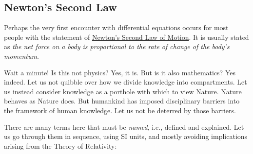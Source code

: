 \documentclass[
  a4paper,
]{article}
\begin{document}
\subsection{Newton's Second Law}\label{newtons-second-law}

Perhaps the very first encounter with differential equations occurs for
most people with the statement of
\href{https://www.britannica.com/science/Newtons-laws-of-motion/Newtons-second-law-F-ma}{Newton's
Second Law of Motion}. It is usually stated as \emph{the net force on a
body is proportional to the rate of change of the body's momentum}.

Wait a minute! Is this not physics? Yes, it is. But is it also
mathematics? Yes indeed. Let us not quibble over how we divide knowledge
into compartments. Let us instead consider knowledge as a porthole with
which to view Nature. Nature behaves as Nature does. But humankind has
imposed disciplinary barriers into the framework of human knowledge. Let
us not be deterred by those barriers.

There are many terms here that must be \emph{named}, i.e., defined and
explained. Let us go through them in sequence, using SI units, and
mostly avoiding implications arising from the Theory of Relativity:
\end{document}
